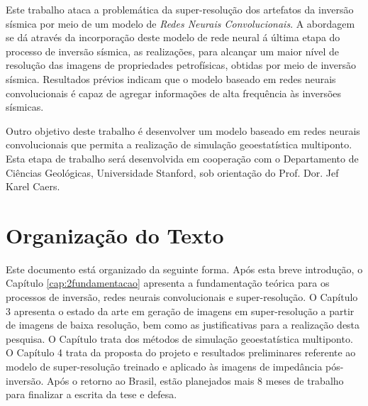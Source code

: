 Este trabalho ataca a problemática da super-resolução dos artefatos da inversão sísmica
por meio de um modelo de \textit{Redes Neurais Convolucionais}.
A abordagem se dá através da incorporação deste modelo de rede neural á última
etapa do processo de inversão sísmica, as realizações, para alcançar um maior nível de
resolução das imagens de propriedades petrofísicas, obtidas por meio de inversão sísmica.
Resultados prévios indicam que o modelo baseado em redes neurais convolucionais é capaz
de agregar informações de alta frequência às inversões sísmicas.

Outro objetivo deste trabalho é desenvolver um modelo baseado em redes neurais convolucionais que permita a
realização de simulação geoestatística multiponto. Esta etapa de trabalho será desenvolvida
em cooperação com o Departamento de Ciências Geológicas, Universidade Stanford, sob
orientação do Prof. Dor. Jef Karel Caers.


\section{Organização do Texto}

Este documento está organizado da seguinte forma. Após esta breve introdução, o
Capítulo \ref{cap:2fundamentacao}
apresenta a fundamentação teórica para os processos de inversão, redes neurais
convolucionais e super-resolução. O Capítulo 3 %
apresenta o estado da arte 
em geração de imagens em super-resolução a partir de imagens de baixa resolução, bem como as justificativas
para a realização desta pesquisa.
O Capítulo trata dos métodos de simulação geoestatística multiponto. O
Capítulo 4 %
trata da proposta do projeto e resultados
preliminares referente ao modelo de super-resolução treinado e aplicado às imagens
de impedância pós-inversão. Após o retorno ao Brasil, estão planejados mais 8 meses
de trabalho para finalizar a escrita da tese e defesa.
